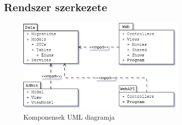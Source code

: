 \documentclass{article}
\begin{document}
	\subsection*{Rendszer szerkezete}
	\begin{figure}[H]
		\centering
		\includegraphics[width=0.75\textwidth]{component}
		\caption{Komponensek UML diagramja}
	\end{figure}
\end{document}
